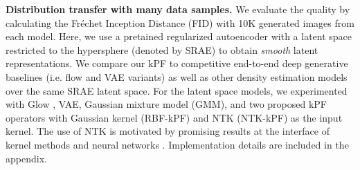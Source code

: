 \textbf{Distribution transfer with many data samples.}
We evaluate the quality by calculating the Fr\'{e}chet Inception Distance (FID) \citep{Martin2017ttur} with 10K generated images from each model. Here, we use a pretained regularized autoencoder \citep{Ghosh2020From} with a latent space restricted to the hypersphere (denoted by SRAE) to obtain \textit{smooth} latent representations. We compare our kPF to competitive end-to-end deep generative baselines (i.e. flow and VAE variants) as well as other density estimation models over the same SRAE latent space. For the latent space models, we experimented with Glow \citep{Kingma2018Glow}, VAE, Gaussian mixture model (GMM), and two proposed kPF operators with Gaussian kernel (RBF-kPF) and NTK (NTK-kPF) as the input kernel. The use of NTK is motivated by promising results at the interface of kernel methods and neural networks \citep{jacot2018NTK, Arora2020Harnessing}. Implementation details are included in the appendix.

    
